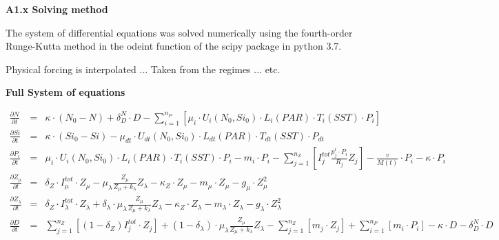\documentclass[11pt,letterpaper,english]{article}
\begin{document}
{\bf {\large A1.x Solving method}}

The system of differential equations was solved numerically using the fourth-order Runge-Kutta method in the odeint function of the scipy package in python 3.7. 

Physical forcing is interpolated ... Taken from the regimes ... etc.


{\bf {\large Full System of equations}}

\begin{eqnarray}
\frac{\partial N}{\partial t} & = & 
\kappa \cdot \left(N_{0} - N\right) + 
\delta^{N}_{D} \cdot D -
\sum_{i=1}^{n_P} [\mu_i \cdot U_{i}(N_0,Si_0)\cdot L_i(PAR)\cdot T_i(SST) \cdot P_{i}] 
\nonumber \\
\frac{\partial Si}{\partial t} & = & 
\kappa \cdot \left(Si_{0} - Si\right) 
- \mu_{dt} \cdot U_{dt}(N_0,Si_0) \cdot L_{dt}(PAR)\cdot T_{dt}(SST) \cdot P_{dt}
\nonumber \\
\frac{\partial P_{i}}{\partial t} & = & 
\mu_{i} \cdot U_{i}(N_0,Si_0)\cdot L_{i}(PAR)\cdot T_{i}(SST) \cdot P_{i}
- m_{i} \cdot P_{i}
- \sum_{j=1}^{n_Z} [I^{tot}_j \frac{p^i_{j} \cdot P_{i}} {R_{j}} Z_{j}] -
\frac{v}{M(t)} \cdot P_{i} -
\kappa \cdot P_{i}
\nonumber \\
\frac{\partial Z_{\mu}}{\partial t} & = & 
\delta_Z \cdot I^{tot}_{\mu} \cdot Z_{\mu}-
\mu^{}_{\lambda} \frac{Z_{\mu}}{Z_{\mu}+k_{\lambda}} Z_{\lambda}-
\kappa_{Z} \cdot Z_{\mu} -
m_{\mu} \cdot Z_{\mu} - 
g_{\mu} \cdot Z_{\mu}^{2}
\nonumber \\
\frac{\partial Z_{\lambda}}{\partial t} & = & 
\delta_Z \cdot I^{tot}_{\lambda} \cdot Z_{\lambda}+
\delta_{\lambda} \cdot \mu^{}_{\lambda} \frac{Z_{\mu}}{Z_{\mu}+k_{\lambda}} Z_{\lambda}-
\kappa_{Z} \cdot Z_{\lambda} -
m_{\lambda} \cdot Z_{\lambda} - 
g_{\lambda} \cdot Z_{\lambda}^{2}
\nonumber \\
\frac{\partial D}{\partial t} & = & 
\sum_{j=1}^{n_Z} [(1-\delta_Z) I^{tot}_j \cdot Z_{j}] +
(1-\delta_{\lambda}) \cdot \mu^{}_{\lambda} \frac{Z_{\mu}}{Z_{\mu}+k_{\lambda}} Z_{\lambda}-
\sum_{j=1}^{n_Z} [m_j \cdot Z_{j}] +
\sum_{i=1}^{n_P} [m_i \cdot P_{i}] -
\kappa \cdot D -
\delta^{N}_{D} \cdot D
\nonumber
\end{eqnarray}
 
\end{document}
